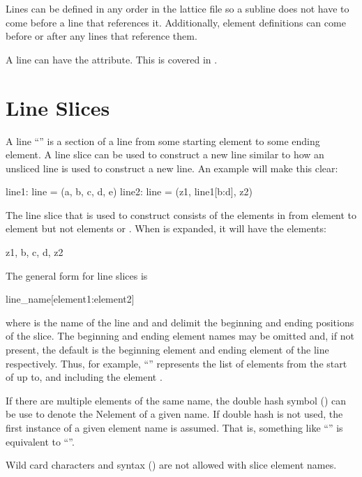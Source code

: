 Lines can be defined in any order in the lattice file so a subline does not have to come before a
line that references it. Additionally, element definitions can come before or after any lines that
reference them.

A line can have the  attribute. This is covered in .

\section{Line Slices}
\label{s:line.slice}

A line ``'' is a section of a line from some starting element to some ending element.  A
line slice can be used to construct a new line similar to how an unsliced line is used to construct
a new line. An example will make this clear:
\begin{example}
  line1: line = (a, b, c, d, e)
  line2: line = (z1, line1[b:d], z2)
\end{example}
The line slice  that is used to construct  consists of the elements in
 from element  to element  but not elements  or . When 
is expanded, it will have the elements:
\begin{example}
  z1, b, c, d, z2
\end{example}

The general form for line slices is
\begin{example}
  line_name[element1:element2]
\end{example}
where  is the name of the line and  and  delimit the
beginning and ending positions of the slice. The beginning and ending element names may be omitted
and, if not present, the default is the beginning element and ending element of the line
respectively. Thus, for example, ``'' represents the list of elements from the start
of  up to, and including the element .

If there are multiple elements of the same name, the double hash \vn{\#\#} symbol
() can be use to denote the N\Th element of a given name. If double hash is not
used, the first instance of a given element name is assumed. That is, something like ``'' is
equivalent to ``''.

Wild card characters and  syntax () are not allowed with
slice element names.

